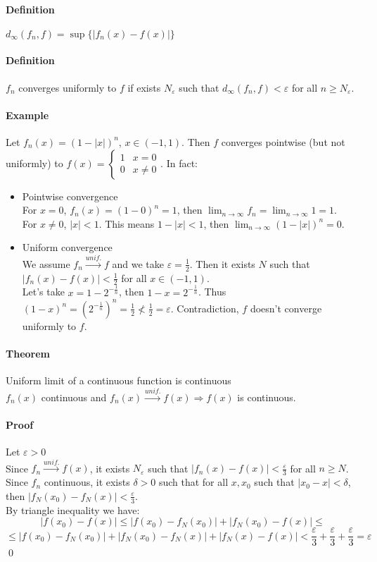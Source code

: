 \documentclass{article}
\newcommand{\DS}{\displaystyle}
\newcommand{\abs}[1]{\left|#1\right|}
\newcommand{\limn}{\lim_{n \to \infty}}
\newcommand{\tounif}{\xrightarrow{unif.}}
\newcommand{\intoo}[1]{\left(#1\right)}
\newcommand{\Ep}{\varepsilon}
\newcommand{\Def}{\paragraph{Definition}}
\newcommand{\Theorem}{\paragraph{Theorem}}
\newcommand{\Proof}{\paragraph{Proof}}
\newcommand{\Example}{\paragraph{Example}}
\begin{document}
	\Def $d_\infty(f_n,f) = \sup \{ \abs{f_n(x) - f(x)} \}$

	\Def $f_n$ converges uniformly to $f$ if exists $N_\Ep$ such that
	$d_\infty(f_n,f) < \Ep$ for all $n \geq N_\Ep$.

	\Example Let $f_n(x) = (1 - \abs{x})^n$, $x \in \intoo{-1,1}$. Then $f$
	converges pointwise (but not uniformly) to $f(x) =
	\begin{cases}1 & x = 0 \\ 0 & x \neq 0\end{cases}$. In fact:
\begin{itemize}
	\item Pointwise convergence
\\For $x = 0$, $f_n(x) = (1 - 0)^n = 1$, then $\DS \limn{f_n} = \limn{1} = 1$.
\\For $x \neq 0$, $\abs{x} < 1$. This means $1 - |x| < 1$, then
	$\DS \limn{(1-|x|)^n} = 0$.

	\item Uniform convergence
\\We assume $f_n \tounif f$ and we take $\Ep = \frac{1}{2}$. Then it exists $N$
	such that $\abs{f_n(x) - f(x)} < \frac{1}{2}$ for all $x \in \intoo{-1,1}$.
\\Let's take $x = 1 - 2^{-\frac{1}{n}}$, then $1 - x = 2^{-\frac{1}{n}}$. Thus
	$(1 - x)^n = (2^{-\frac{1}{n}})^n = \frac{1}{2} \nless \frac{1}{2} = \Ep$.
	Contradiction, $f$ doesn't converge uniformly to $f$.
\end{itemize}

	\Theorem Uniform limit of a continuous function is continuous
\\$f_n(x)$ continuous and $f_n(x) \tounif f(x) \Rightarrow f(x)$ is continuous.

	\Proof Let $\Ep > 0$
\\Since $f_n \tounif f(x)$, it exists $N_\Ep$ such that $\abs{f_n(x)-f(x)} <
	\frac{\Ep}{3}$ for all $n \geq N$.
\\Since $f_n$ continuous, it exists $\delta > 0$ such that for all $x,x_0$ such
	that $\abs{x_0 - x} < \delta$, then $\abs{f_N(x_0) - f_N(x)} < \frac{\Ep}{3}$.
\\By triangle inequality we have:
\begin{equation*}
	\abs{f(x_0) - f(x)} \leq \abs{f(x_0) - f_N(x_0)} + \abs{f_N(x_0) - f(x)} \leq
\end{equation*}
\begin{equation*} \leq
	\abs{f(x_0) - f_N(x_0)} + \abs{f_N(x_0) - f_N(x)} + \abs{f_N(x) - f(x)} <
	\frac{\Ep}{3} + \frac{\Ep}{3} + \frac{\Ep}{3} = \Ep
\end{equation*}
	\qed
\end{document}
